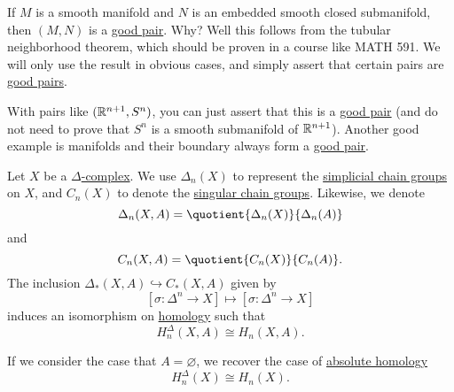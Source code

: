 \begin{remark}
	If \(M\) is a smooth manifold and \(N\) is an embedded smooth closed submanifold, then \((M, N)\) is a \hyperref[def:good-pair]{good pair}.
	Why? Well this follows from the tubular neighborhood theorem, which should be proven in a course like MATH 591. We will only use the result
	in obvious cases, and simply assert that certain pairs are \hyperref[def:good-pair]{good pairs}.
\end{remark}

With pairs like \((\mathbb{\MakeUppercase{r}}^{n + 1}, S^n)\), you can just assert that this is a \hyperref[def:good-pair]{good pair} (and do
not need to prove that \(S^n\) is a smooth submanifold of \(\mathbb{\MakeUppercase{r}}^{n + 1}\)). Another good example is manifolds and their
boundary always form a \hyperref[def:good-pair]{good pair}.

\begin{theorem}\label{thm:singular-homology-agrees-with-simplicial-homology}
	Let \(X\) be a \hyperref[def:delta-complex]{\(\Delta\)-complex}. We use \(\Delta_n(X)\) to represent the
	\hyperref[def:simplicial-complex]{simplicial chain groups} on \(X\), and \(C_n(X)\) to denote the
	\hyperref[def:singular-chain-group]{singular chain groups}. Likewise, we denote
	\[
		\Delta_n(X, A) = \quotient{\Delta_n(X)}{\Delta_n(A)}
	\]
	and
	\[
		C_n(X, A) = \quotient{C_n(X)}{C_n(A)}.
	\]
	The inclusion \(\Delta_\ast(X, A) \hookrightarrow C_\ast(X, A)\) given by
	\[
		[\sigma \colon \Delta^n \to X] \mapsto [\sigma : \Delta^n \to X]
	\]
	induces an isomorphism on \hyperref[def:homology-group]{homology} such that
	\[
		H_n^\Delta(X, A) \cong H_n(X, A).
	\]

	If we consider the case that \(A = \varnothing\), we recover the case of \hyperref[def:homology-group]{absolute homology}
	\[
		H_n^\Delta(X) \cong H_n(X).
	\]
\end{theorem}

